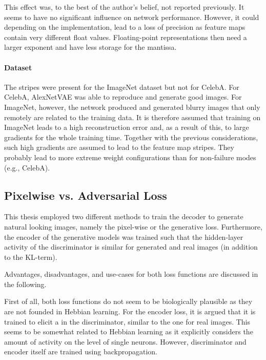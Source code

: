 This effect was, to the best of the author's belief, not reported previously.
It seems to have no significant influence on network performance.
However, it could depending on the implementation, lead to a loss of precision as feature maps contain very different float values.
Floating-point representations then need a larger exponent and have less storage for the mantissa.

\paragraph{Dataset}
The stripes were present for the ImageNet dataset but not for CelebA.
For CelebA, AlexNetVAE was able to reproduce and generate good images.
For ImageNet, however, the network produced and generated blurry images that only remotely are related to the training data.
It is therefore assumed that training on ImageNet leads to a high reconstruction error and, as a result of this, to large gradients for the whole training time.
Together with the previous considerations, such high gradients are assumed to lead to the feature map stripes.
They probably lead to more extreme weight configurations than for non-failure modes (e.g., CelebA).

\subsection{Pixelwise vs. Adversarial Loss}\label{subsec:pixelwise-vs.-adversarial-loss}
This thesis employed two different methods to train the decoder to generate natural looking images, namely the pixel-wise or the generative loss.
Furthermore, the encoder of the generative models was trained such that the hidden-layer activity of the discriminator is similar for generated and real images (in addition to the KL-term).

Advantages, disadvantages, and use-cases for both loss functions are discussed in the following.

First of all, both loss functions do not seem to be biologically plausible as they are not founded in Hebbian learning.
For the encoder loss, it is argued that it is trained to elicit a  in the discriminator, similar to the one for real images.
This  seems to be somewhat related to Hebbian learning as it explicitly considers the amount of activity on the level of single neurons.
However, discriminator and encoder itself are trained using backpropagation.

